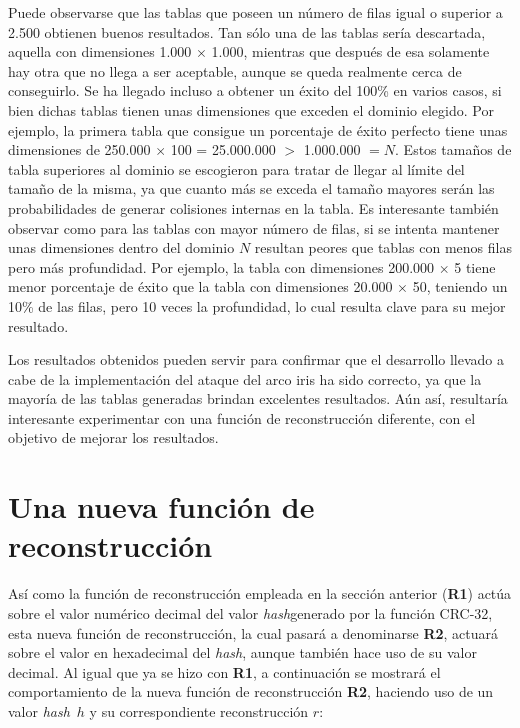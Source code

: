\documentclass[12pt,spanish,listoffigures,listoftables,listofalgorithms]{tfgetsinf}
\newcommand{\hash}{\textit{hash}}
\begin{document}
Puede observarse que las tablas que poseen un número de filas igual o superior a 2.500 obtienen buenos resultados. Tan sólo una de las tablas sería descartada, aquella con dimensiones 1.000 $\times$ 1.000, mientras que después de esa solamente hay otra que no llega a ser aceptable, aunque se queda realmente cerca de conseguirlo. Se ha llegado incluso a obtener un éxito del 100\% en varios casos, si bien dichas tablas tienen unas dimensiones que exceden el dominio elegido. Por ejemplo, la primera tabla que consigue un porcentaje de éxito perfecto tiene unas dimensiones de 250.000 $\times$ 100 = 25.000.000 $>$ 1.000.000 $= N$. Estos tamaños de tabla superiores al dominio se escogieron para tratar de llegar al límite del tamaño de la misma, ya que cuanto más se exceda el tamaño mayores serán las probabilidades de generar colisiones internas en la tabla. Es interesante también observar como para las tablas con mayor número de filas, si se intenta mantener unas dimensiones dentro del dominio $N$ resultan peores que tablas con menos filas pero más profundidad. Por ejemplo, la tabla con dimensiones 200.000 $\times$ 5 tiene menor porcentaje de éxito que la tabla con dimensiones 20.000 $\times$ 50, teniendo un 10\% de las filas, pero 10 veces la profundidad, lo cual resulta clave para su mejor resultado.

Los resultados obtenidos pueden servir para confirmar que el desarrollo llevado a cabe de la implementación del ataque del arco iris ha sido correcto, ya que la mayoría de las tablas generadas brindan excelentes resultados. Aún así, resultaría interesante experimentar con una función de reconstrucción diferente, con el objetivo de mejorar los resultados.

\section{Una nueva función de reconstrucción}

Así como la función de reconstrucción empleada en la sección anterior (\textbf{R1}) actúa sobre el valor numérico decimal del valor \hash generado por la función CRC-32, esta nueva función de reconstrucción, la cual pasará a denominarse \textbf{R2}, actuará sobre el valor en hexadecimal del \hash, aunque también hace uso de su valor decimal. Al igual que ya se hizo con \textbf{R1}, a continuación se mostrará el comportamiento de la nueva función de reconstrucción \textbf{R2}, haciendo uso de un valor \hash~$h$ y su correspondiente reconstrucción $r$:
\end{document}
